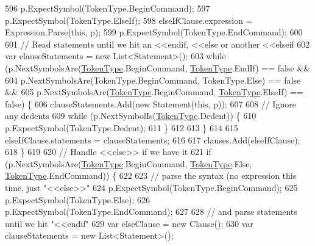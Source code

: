 \begin{DoxyCode}
596                     p.ExpectSymbol(TokenType.BeginCommand);
597                     p.ExpectSymbol(TokenType.ElseIf);
598                     elseIfClause.expression = Expression.Parse(\textcolor{keyword}{this}, p);
599                     p.ExpectSymbol(TokenType.EndCommand);
600 
601                     \textcolor{comment}{// Read statements until we hit an <<endif, <<else or another <<elseif}
602                     var clauseStatements = \textcolor{keyword}{new} List<Statement>();
603                     \textcolor{keywordflow}{while} (p.NextSymbolsAre(\hyperlink{a00041_a301aa7c866593a5b625a8fc158bbeace}{TokenType}.BeginCommand, 
      \hyperlink{a00041_a301aa7c866593a5b625a8fc158bbeace}{TokenType}.EndIf) == \textcolor{keyword}{false} &&
604                         p.NextSymbolsAre(TokenType.BeginCommand, TokenType.Else) == \textcolor{keyword}{false} &&
605                         p.NextSymbolsAre(\hyperlink{a00041_a301aa7c866593a5b625a8fc158bbeace}{TokenType}.BeginCommand, 
      \hyperlink{a00041_a301aa7c866593a5b625a8fc158bbeace}{TokenType}.ElseIf) == \textcolor{keyword}{false}) \{
606                         clauseStatements.Add(\textcolor{keyword}{new} Statement(\textcolor{keyword}{this}, p));
607 
608                         \textcolor{comment}{// Ignore any dedents}
609                         \textcolor{keywordflow}{while} (p.NextSymbolIs(\hyperlink{a00041_a301aa7c866593a5b625a8fc158bbeace}{TokenType}.Dedent)) \{
610                             p.ExpectSymbol(TokenType.Dedent);
611                         \}
612 
613                     \}
614 
615                     elseIfClause.statements = clauseStatements;
616 
617                     clauses.Add(elseIfClause);
618                 \}
619 
620                 \textcolor{comment}{// Handle <<else>> if we have it}
621                 \textcolor{keywordflow}{if} (p.NextSymbolsAre(\hyperlink{a00041_a301aa7c866593a5b625a8fc158bbeace}{TokenType}.BeginCommand, \hyperlink{a00041_a301aa7c866593a5b625a8fc158bbeace}{TokenType}.Else, 
      \hyperlink{a00041_a301aa7c866593a5b625a8fc158bbeace}{TokenType}.EndCommand)) \{
622 
623                     \textcolor{comment}{// parse the syntax (no expression this time, just "<<else>>"}
624                     p.ExpectSymbol(TokenType.BeginCommand);
625                     p.ExpectSymbol(TokenType.Else);
626                     p.ExpectSymbol(TokenType.EndCommand);
627 
628                     \textcolor{comment}{// and parse statements until we hit "<<endif"}
629                     var elseClause = \textcolor{keyword}{new} Clause();
630                     var clauseStatements = \textcolor{keyword}{new} List<Statement>();

\end{DoxyCode}
